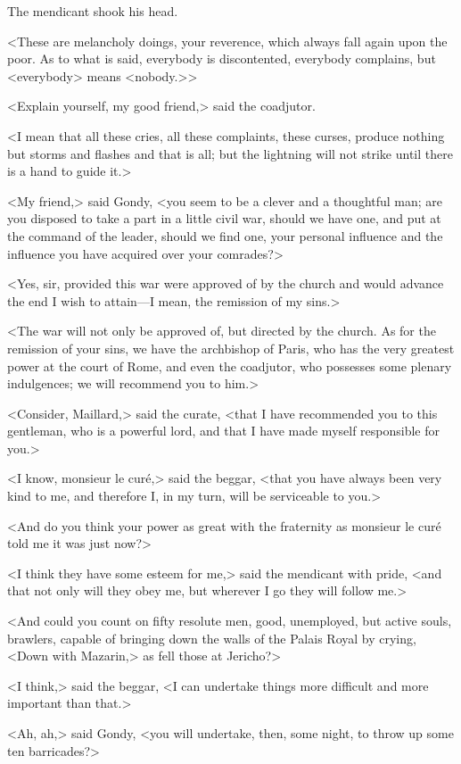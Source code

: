 The mendicant shook his head.

<These are melancholy doings, your reverence, which always fall again upon the poor. As to what is said, everybody is discontented, everybody complains, but <everybody> means <nobody.>>

<Explain yourself, my good friend,> said the coadjutor.

<I mean that all these cries, all these complaints, these curses, produce nothing but storms and flashes and that is all; but the lightning will not strike until there is a hand to guide it.>

<My friend,> said Gondy, <you seem to be a clever and a thoughtful man; are you disposed to take a part in a little civil war, should we have one, and put at the command of the leader, should we find one, your personal influence and the influence you have acquired over your comrades?>

<Yes, sir, provided this war were approved of by the church and would advance the end I wish to attain—I mean, the remission of my sins.>

<The war will not only be approved of, but directed by the church. As for the remission of your sins, we have the archbishop of Paris, who has the very greatest power at the court of Rome, and even the coadjutor, who possesses some plenary indulgences; we will recommend you to him.>

<Consider, Maillard,> said the curate, <that I have recommended you to this gentleman, who is a powerful lord, and that I have made myself responsible for you.>

<I know, monsieur le curé,> said the beggar, <that you have always been very kind to me, and therefore I, in my turn, will be serviceable to you.>

<And do you think your power as great with the fraternity as monsieur le curé told me it was just now?>

<I think they have some esteem for me,> said the mendicant with pride, <and that not only will they obey me, but wherever I go they will follow me.>

<And could you count on fifty resolute men, good, unemployed, but active souls, brawlers, capable of bringing down the walls of the Palais Royal by crying, <Down with Mazarin,> as fell those at Jericho?>

<I think,> said the beggar, <I can undertake things more difficult and more important than that.>

<Ah, ah,> said Gondy, <you will undertake, then, some night, to throw up some ten barricades?>


